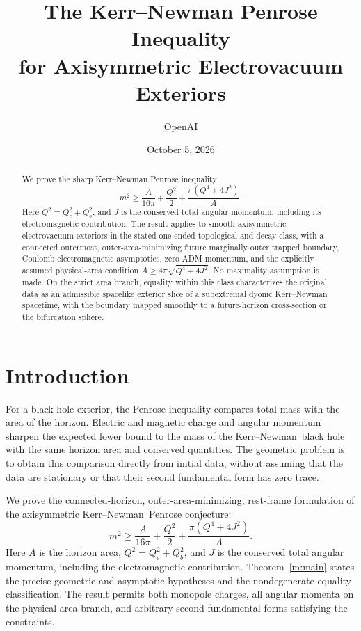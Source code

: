 \documentclass[11pt]{article}
\title{The Kerr--Newman Penrose Inequality\\for Axisymmetric Electrovacuum Exteriors}
\author{OpenAI}
\date{October 5, 2026}
\numberwithin{equation}{section}
\theoremstyle{definition}
\theoremstyle{remark}
\newcommand{\KN}{Kerr--Newman}
\begin{document}
\maketitle
\begin{abstract}
We prove the sharp Kerr--Newman Penrose inequality
\[
m^2\ge \frac{A}{16\pi}+\frac{Q^2}{2}
       +\frac{\pi(Q^4+4J^2)}{A}.
\]
Here \(Q^2=Q_e^2+Q_b^2\), and \(J\) is the conserved total angular
momentum, including its electromagnetic contribution. The result applies
to smooth axisymmetric electrovacuum exteriors in the stated one-ended
topological and decay class, with a connected outermost, outer-area-minimizing
future marginally outer trapped boundary, Coulomb electromagnetic asymptotics,
zero ADM momentum, and the explicitly assumed physical-area condition
\(A\ge4\pi\sqrt{Q^4+4J^2}\). No maximality assumption is made. On the
strict area branch, equality within this class characterizes the original
data as an admissible spacelike exterior slice of a subextremal dyonic
Kerr--Newman spacetime, with the boundary mapped smoothly to a
future-horizon cross-section or the bifurcation sphere.
\end{abstract}

\section{Introduction}
\label{m:introduction}

For a black-hole exterior, the Penrose inequality compares total mass with the
area of the horizon. Electric and magnetic charge and angular momentum sharpen
the expected lower bound to the mass of the \KN\ black hole with the same
horizon area and conserved quantities. The geometric problem is to obtain this
comparison directly from initial data, without assuming that the data are
stationary or that their second fundamental form has zero trace.



We prove the connected-horizon, outer-area-minimizing, rest-frame formulation
of the axisymmetric \KN\ Penrose conjecture:
\[
 m^2\ge\frac{A}{16\pi}+\frac{Q^2}{2}
                 +\frac{\pi(Q^4+4J^2)}{A}.
\]
Here \(A\) is the horizon area, \(Q^2=Q_e^2+Q_b^2\), and \(J\) is the
conserved total angular momentum, including the electromagnetic contribution.
Theorem~\ref{m:main} states the precise geometric and asymptotic hypotheses
and the nondegenerate equality classification. The result permits both
monopole charges, all angular momenta on the physical area branch, and
arbitrary second fundamental forms satisfying the constraints.
\end{document}
